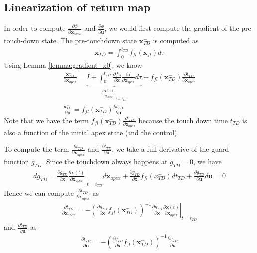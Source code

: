 \documentclass{article}
\begin{document}
\subsection{Linearization of return map}
In order to compute $\frac{\partial\phi}{\partial{\mathbf{x}}_{apex}}$ and $\frac{\partial\phi}{\partial \mathbf{u}}$, we would first compute the gradient of the pre-touch-down state. The pre-touchdown state $\mathbf{x}_{TD}^-$ is computed as
\begin{align}
	\mathbf{x}_{TD}^- = \int_0^{t_{TD}} f_{fl}(\mathbf{x}_{fl}) d\tau
\end{align}
Using Lemma \ref{lemma:gradient_x0}, we know
\begin{align}
	\frac{\mathbf{x}_{TD}^-}{\partial \mathbf{x}_{apex}} = \underbrace{I + \int_0^{t_{TD}} \frac{\partial f_{fl}}{\partial \mathbf{x}}\frac{\partial \mathbf{x}}{\partial \mathbf{x}_{apex}} d\tau}_{\left.\frac{\partial \mathbf{x}(t)}{\partial x_{apex}}\right|_{t=t_{TD}}} + f_{fl}(\mathbf{x}_{TD}^-)\frac{\partial t_{TD}}{\partial \mathbf{x}_{apex}}\\
	\frac{\mathbf{x}_{TD}^-}{\partial \mathbf{u}} = f_{fl}(\mathbf{x}_{TD}^-)\frac{\partial t_{TD}}{\partial \mathbf{u}}
\end{align}
Note that we have the term $f_{fl}(\mathbf{x}_{TD}^-)\frac{\partial t_{TD}}{\partial \mathbf{x}_{apex}}$ because the touch down time $t_{TD}$ is also a function of the initial apex state (and the control).

To compute the term $\frac{\partial t_{TD}}{\partial \mathbf{x}_{apex}}$ and $\frac{\partial t_{TD}}{\partial \mathbf{u}}$, we take a full derivative of the guard function $g_{TD}$. Since the touchdown always happens at $g_{TD} = 0$, we have
\begin{align}
	dg_{TD} = \frac{\partial g_{TD}}{\partial \mathbf{x}}\left.\frac{\partial \mathbf{x}(t)}{\partial \mathbf{x}_{apex}}\right|_{t=t_{TD}}d\mathbf{x}_{apex} + \frac{\partial g_{TD}}{\partial\mathbf{x}}f_{fl}(x^-_{TD})dt_{TD} + \frac{\partial g_{TD}}{\partial\mathbf{u}}d\mathbf{u} = 0
\end{align}
Hence we can compute $\frac{\partial t_{TD}}{\partial \mathbf{x}_{apex}}$ as
\begin{align}
	\frac{\partial t_{TD}}{\partial \mathbf{x}_{apex}} =-\left(\frac{\partial{g}_{TD}}{\partial \mathbf{x}}f_{fl}(\mathbf{x}_{TD}^-)\right)^{-1}\frac{\partial g_{TD}}{\partial \mathbf{x}}\left.\frac{\partial \mathbf{x}(t)}{\partial \mathbf{x}_{apex}}\right|_{t = t_{TD}}
\end{align}
and  $\frac{\partial t_{TD}}{\partial \mathbf{u}}$ as
\begin{align}
	\frac{\partial t_{TD}}{\partial \mathbf{u}} = -\left(\frac{\partial{g}_{TD}}{\partial \mathbf{x}}f_{fl}(\mathbf{x}_{TD}^-)\right)^{-1}\frac{\partial g_{TD}}{\partial \mathbf{u}}
\end{align}
\end{document}
